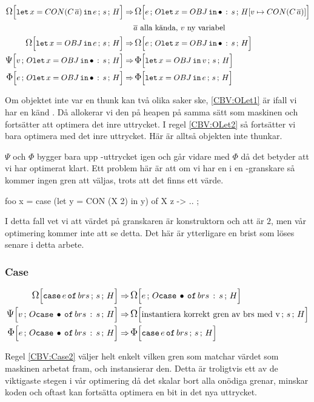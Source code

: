 \documentclass[../Optimise]{subfiles}
\begin{document}
\begin{align}
\label{CBV:OLet1} \OMEGA sH{\eLet x{\CON{C}{\many{a}}}{e}}  \Rightarrow &\, \OMEGA{\oLetObj x{OBJ}s}{\heap{v}{\CON{C}{\many{a}}}}e\\
 & \many{a} \text{ alla kända, } v \text{ ny variabel} \nonumber \\
\label{CBV:OLet2}\OMEGA sH{\eLet x{OBJ}{e}}  \Rightarrow &\, \OMEGA{\oLetObj x{OBJ}s}He\\
\PSI{\oLetObj x{OBJ}s}Hv  \Rightarrow &\, \IRR sH{\eLet x{OBJ}v}\\
\IRR{\oLetObj x{OBJ}s}He  \Rightarrow &\, \IRR sH{\eLet x{OBJ}e}
\end{align}

Om objektet inte var en thunk kan två olika saker ske, \eqref{CBV:OLet1} är ifall 
vi har en känd . Då allokerar vi den på heapen på samma sätt som maskinen
och fortsätter att optimera det inre uttrycket. I regel \eqref{CBV:OLet2} så 
fortsätter vi bara optimera med det inre uttrycket. Här är alltså objekten
inte thunkar.

$\Psi$ och $\Phi$ bygger bara upp -uttrycket igen och går vidare med $\Phi$
då det betyder att vi har optimerat klart. Ett problem här är att om vi har en 
i en -granskare så kommer ingen gren att väljas, trots att det finns ett värde.

\begin{codeEx}
foo x = case (let y = CON (X 2) in y) of
    { X z -> ..
    };
\end{codeEx} 

I detta fall vet vi att värdet på granskaren är konstruktorn  och att  är $2$, men vår optimering
kommer inte att se detta. Det här är ytterligare en brist som löses senare i detta arbete.

\subsubsection{Case}
\label{cbv:case}
\begin{align}
\OMEGA sH{\eCase e{brs}} \Rightarrow &\, \OMEGA{\oCase{brs}s}He\\
\label{CBV:Case2} \PSI{\oCase{brs}s}Hv \Rightarrow &\, \OMEGA sH{\text{instantiera korrekt gren av brs med v}} \\
\label{CBV:Case3} \IRR{\oCase{brs}s}He \Rightarrow &\, \IRR sH{\eCase e brs}
\end{align}

Regel \eqref{CBV:Case2} väljer helt enkelt vilken gren som matchar
värdet som maskinen arbetat fram, och instansierar den. Detta är troligtvis ett
av de viktigaste stegen i vår optimering då det skalar bort alla onödiga 
grenar, minskar koden och oftast kan fortsätta optimera en bit in det nya uttrycket.
\end{document}
